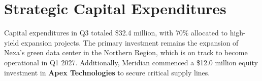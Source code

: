 \section{Strategic Capital Expenditures}
Capital expenditures in Q3 totaled \$32.4 million, with 70\% allocated to high-yield expansion projects. The primary investment remains the expansion of Nexa's green data center in the Northern Region, which is on track to become operational in Q1 2027. Additionally, Meridian commenced a \$12.0 million equity investment in \textbf{Apex Technologies} to secure critical supply lines.
